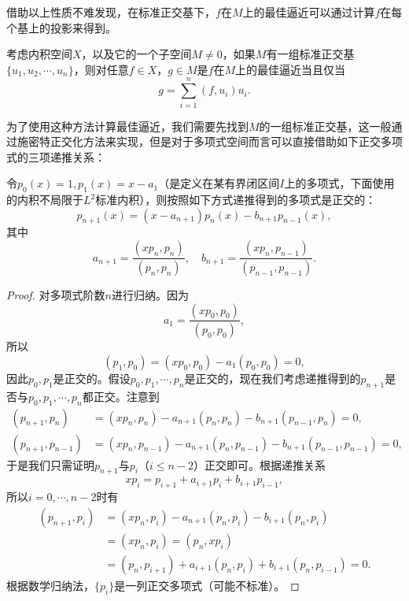 \documentclass[a4paper,10pt]{ctexart}
\begin{document}
借助以上性质不难发现，在标准正交基下，$ f $在$ M $上的最佳逼近可以通过计算$ f $在每个基上的投影来得到。
\begin{theorem}
    考虑内积空间$ X $，以及它的一个子空间$ M\ne 0 $，如果$ M $有一组标准正交基$ \{u_1,u_2,\cdots ,u_n\} $，则对任意$ f\in X $，$ g\in M $是$ f $在$ M $上的最佳逼近当且仅当
    \begin{equation}
        g = \sum_{i=1}^{n} (f,u_i)u_i.
    \end{equation}
\end{theorem}
为了使用这种方法计算最佳逼近，我们需要先找到$ M $的一组标准正交基，这一般通过施密特正交化方法来实现，但是对于多项式空间而言可以直接借助如下正交多项式的三项递推关系：
\begin{theorem}
    令$ p_0(x)=1,p_1(x)=x-a_1 $（是定义在某有界闭区间$ I $上的多项式，下面使用的内积不局限于$ L^2 $标准内积），则按照如下方式递推得到的多项式是正交的：
    \begin{equation}
        p_{n+1}(x) = (x-a_{n+1})p_n(x) - b_{n+1}p_{n-1}(x),
    \end{equation}
    其中
    \begin{equation}
        a_{n+1} = \frac{(xp_n,p_n)}{(p_n,p_n)},\quad b_{n+1} = \frac{(xp_n,p_{n-1})}{(p_{n-1},p_{n-1})}.
    \end{equation}
\end{theorem}
\begin{proof}
    对多项式阶数$ n $进行归纳。因为
    \[
        a_1 = \frac{(xp_0,p_0)}{(p_0,p_0)},
    \]
    所以
    \[
        (p_1,p_0) = (xp_0,p_0) - a_1 (p_0,p_0) = 0,
    \]
    因此$ p_0,p_1 $是正交的。假设$ p_0,p_1,\cdots ,p_n $是正交的，现在我们考虑递推得到的$ p_{n+1} $是否与$ p_0,p_1,\cdots ,p_n $都正交。注意到
    \[
        \begin{aligned}
            (p_{n+1},p_n) &= (xp_n,p_n) - a_{n+1} (p_n,p_n) - b_{n+1} (p_{n-1},p_n) = 0, \\
            (p_{n+1},p_{n-1}) &= (xp_n,p_{n-1}) - a_{n+1} (p_n,p_{n-1}) - b_{n+1} (p_{n-1},p_{n-1}) = 0,
        \end{aligned}
    \]
    于是我们只需证明$ p_{n+1} $与$ p_i $（$ i\leqslant n-2 $）正交即可。根据递推关系
    \[
        xp_i = p_{i+1}+ a_{i+1}p_i + b_{i+1}p_{i-1},
    \]
    所以$ i=0,\cdots ,n-2 $时有
    \[
        \begin{aligned}
            (p_{n+1},p_i) 
            &= (xp_n,p_i) - a_{n+1} (p_n,p_i) - b_{i+1} (p_n,p_i)\\
            &= (xp_n,p_i) = (p_n,xp_i)\\
            &= (p_n,p_{i+1}) + a_{i+1} (p_n,p_i) + b_{i+1} (p_n,p_{i-1}) = 0.
        \end{aligned}
    \]
    根据数学归纳法，$ \{p_i\} $是一列正交多项式（可能不标准）。
\end{proof}
\end{document}
